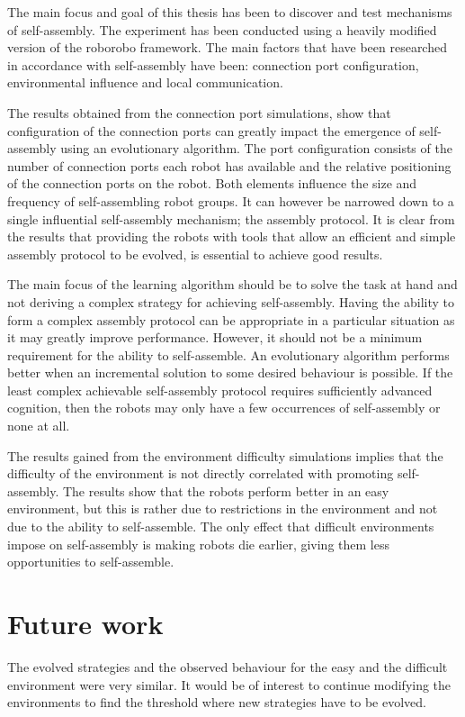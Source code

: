 The main focus and goal of this thesis has been to discover and test mechanisms of self-assembly.
The experiment has been conducted using a heavily modified version of the roborobo framework.
The main factors that have been researched in accordance with self-assembly have been: connection port configuration, environmental influence and local communication.

The results obtained from the connection port simulations, show that configuration of the connection ports can greatly impact the emergence of self-assembly using an evolutionary algorithm.
The port configuration consists of the number of connection ports each robot has available and the relative positioning of the connection ports on the robot.
Both elements influence the size and frequency of self-assembling robot groups.
It can however be narrowed down to a single influential self-assembly mechanism; the assembly protocol.
It is clear from the results that providing the robots with tools that allow an efficient and simple assembly protocol to be evolved, is essential to achieve good results.

The main focus of the learning algorithm should be to solve the task at hand and not deriving a complex strategy for achieving self-assembly.
Having the ability to form a complex assembly protocol can be appropriate in a particular situation as it may greatly improve performance.
However, it should not be a minimum requirement for the ability to self-assemble.
An evolutionary algorithm performs better when an incremental solution to some desired behaviour is possible.
If the least complex achievable self-assembly protocol requires sufficiently advanced cognition, then the robots may only have a few occurrences of self-assembly or none at all.

The results gained from the environment difficulty simulations implies that the difficulty of the environment is not directly correlated with promoting self-assembly.
The results show that the robots perform better in an easy environment, but this is rather due to restrictions in the environment and not due to the ability to self-assemble.
The only effect that difficult environments impose on self-assembly is making robots die earlier, giving them less opportunities to self-assemble.


\section{Future work}
The evolved strategies and the observed behaviour for the easy and the difficult environment were very similar.
It would be of interest to continue modifying the environments to find the threshold where new strategies have to be evolved. 